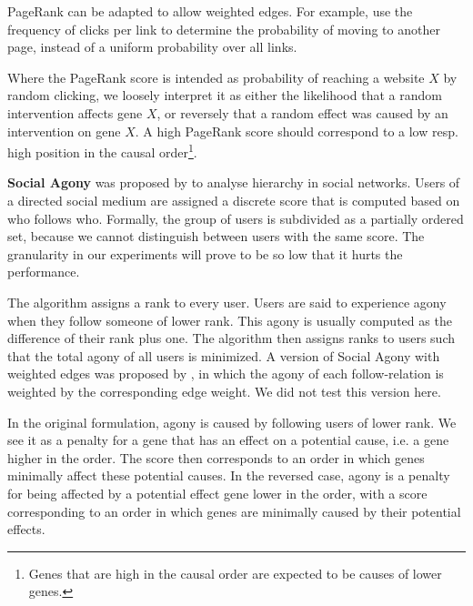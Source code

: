 PageRank can be adapted to allow weighted edges. For example, \citet{tyagi2012weighted} use the frequency of clicks per link to determine the probability of moving to another page, instead of a uniform probability over all links.

Where the PageRank score is intended as probability of reaching a website $X$ by random clicking, we loosely interpret it as either the likelihood that a random intervention affects gene $X$, or reversely that a random effect was caused by an intervention on gene $X$. A high PageRank score should correspond to a low resp. high position in the causal order\footnote{Genes that are high in the causal order are expected to be causes of lower genes.}.

\textbf{Social Agony} was proposed by \citet{gupte2011finding} to analyse hierarchy in social networks. Users of a directed social medium are assigned a discrete score that is computed based on who follows who. Formally, the group of users is subdivided as a partially ordered set, because we cannot distinguish between users with the same score. The granularity in our experiments will prove to be so low that it hurts the performance. 

The algorithm assigns a rank to every user. Users are said to experience agony when they follow someone of lower rank. This agony is usually computed as the difference of their rank plus one. The algorithm then assigns ranks to users such that the total agony of all users is minimized. A version of Social Agony with weighted edges was proposed by \citet{tatti2015hierarchies}, in which the agony of each follow-relation is weighted by the corresponding edge weight. We did not test this version here.

In the original formulation, agony is caused by following users of lower rank. We see it as a penalty for a gene that has an effect on a potential cause, i.e. a gene higher in the order. The score then corresponds to an order in which genes minimally affect these potential causes. In the reversed case, agony is a penalty for being affected by a potential effect gene lower in the order, with a score corresponding to an order in which genes are minimally caused by their potential effects.

